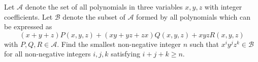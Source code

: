 Let $\mathcal{A}$ denote the set of all polynomials in three variables $x, y, z$ with integer coefficients. Let $\mathcal{B}$ denote the subset of $\mathcal{A}$ formed by all polynomials which can be expressed as
\[
(x+y+z)P(x,y,z) + (xy+yz+zx)Q(x,y,z) + xyzR(x,y,z)
\]
with $P, Q, R \in \mathcal{A}$. Find the smallest non-negative integer $n$ such that $x^i y^j z^k \in \mathcal{B}$ for all non-negative integers $i, j, k$ satisfying $i + j + k \geqslant n$.
